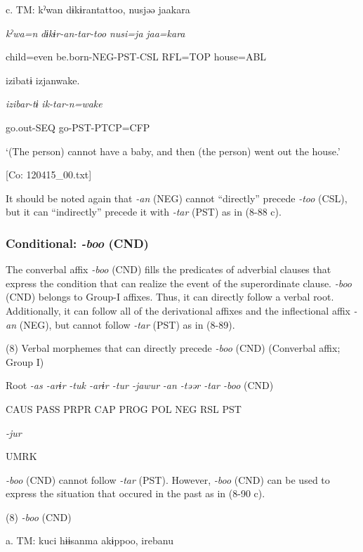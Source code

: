   c.  TM:  kˀwan  dɨkɨrantattoo,  nusjəə  jaakara

      \textit{kˀwa=n}  \textit{dɨkɨr-an-tar-too}  \textit{nusi=ja}  \textit{jaa=kara}

      child=even  be.born-NEG-PST-CSL  RFL=TOP  house=ABL

      izibatɨ  izjanwake.

      \textit{izibar-tɨ}  \textit{ik-tar-n=wake}

      go.out-SEQ  go-PST-PTCP=CFP

      ‘(The person) cannot have a baby, and then (the person) went out the house.’

      [Co: 120415\_00.txt]

It should be noted again that \textit{-an} (NEG) cannot “directly” precede \textit{{}-too} (CSL), but it can “indirectly” precede it with \textit{{}-tar} (PST) as in (8-88 c).

\subsubsection{Conditional: \textit{{}-boo} (CND)}

The converbal affix \textit{{}-boo} (CND) fills the predicates of adverbial clauses that express the condition that can realize the event of the superordinate clause. \textit{{}-boo} (CND) belongs to Group-I affixes. Thus, it can directly follow a verbal root. Additionally, it can follow all of the derivational affixes and the inflectional affix \textit{{}-an} (NEG), but cannot follow \textit{{}-tar} (PST) as in (8-89).

(8)  Verbal morphemes that can directly precede \textit{{}-boo} (CND) (Converbal affix; Group I)

  Root  \textit{{}-as  {}-arɨr} %
\textit{{}-tuk  {}-arɨr  {}-tur  {}-jawur} %
\textit{{}-an  {}-təər  {}-tar  {}-boo} (CND)

    CAUS  PASS  PRPR  CAP  PROG  POL  NEG  RSL  PST  

          \textit{{}-jur} 

          UMRK    

\textit{{}-boo} (CND) cannot follow \textit{{}-tar} (PST). However, \textit{-boo} (CND) can be used to express the situation that occured in the past as in (8-90 c).

(8)  \textit{{}-boo} (CND)

  a.  TM:  kuci  hɨɨsanma  akɨppoo,  {\textbar}ireba{\textbar}nu

